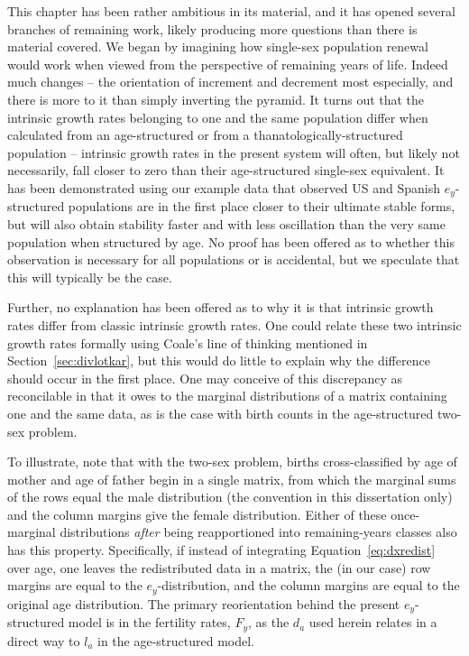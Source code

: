 \FloatBarrier

This chapter has been rather ambitious in its material, and it has opened
several branches of remaining work, likely producing more questions
than there is material covered. We began by imagining how single-sex population
renewal would work when viewed from the perspective of remaining years of life. 
Indeed much changes -- the orientation of increment and decrement most
especially, and there is more to it than simply inverting the pyramid. It turns
out that the intrinsic growth rates belonging to one and the same population 
differ when calculated from an age-structured or from a thanatologically-structured population -- intrinsic growth rates in the present
system will often, but likely not necessarily, fall closer to zero than their
age-structured single-sex equivalent. It has been demonstrated using our 
example data that observed US and Spanish $e_y$-structured populations
are in the first place closer to their ultimate stable forms, but will also 
obtain stability faster and with less oscillation
than the very same population when structured by age. No proof has been offered
as to whether this observation is necessary for all populations or is
accidental, but we speculate that this will typically be the case. 

Further, no explanation
has been offered as to why it is that intrinsic growth rates differ from classic 
intrinsic growth rates. One could relate these two intrinsic growth
rates formally using Coale's line of thinking mentioned in
Section~\ref{sec:divlotkar}, but this would do little to explain why the
difference should occur in the first place. One may conceive of this
discrepancy as reconcilable in that it owes to the marginal distributions
of a matrix containing one and the same data, as is the case with birth counts
in the age-structured two-sex problem. 

To illustrate, note that with the two-sex
problem, births cross-classified by age of mother and age of father begin 
in a single matrix, from which the marginal
sums of the rows equal the male distribution (the convention in this
dissertation only) and the column margins give the female distribution. Either
of these once-marginal distributions \textit{after} being reapportioned into
remaining-years classes also has this property. Specifically, if instead of
integrating Equation~\eqref{eq:dxredist} over age, one leaves the redistributed
data in a matrix, the (in our case) row margins are equal to the
$e_y$-distribution, and the column margins are equal to the original age
distribution. The primary reorientation behind the present
$e_y$-structured model is in the fertility rates, $F_y$, as the $d_a$ used
herein relates in a direct way to $l_a$ in the age-structured model. 

